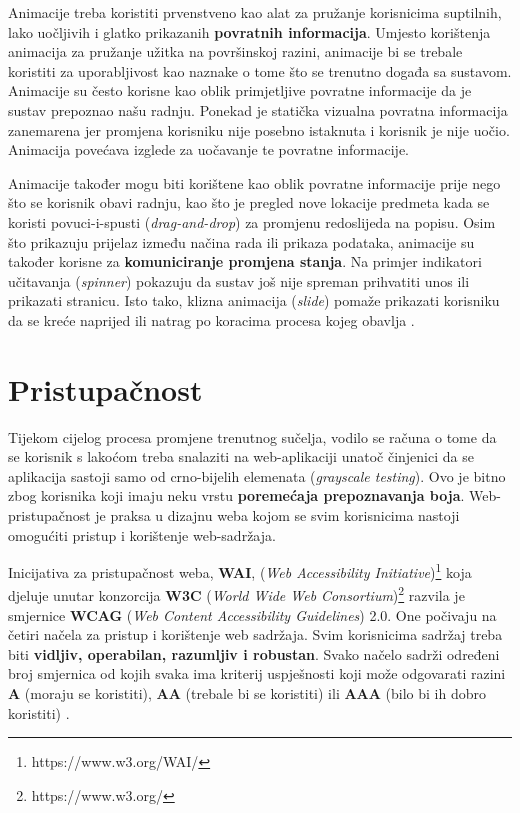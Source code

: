 \documentclass[times, utf8, zavrsni, numeric]{fer}
\begin{document}
    Animacije treba koristiti prvenstveno kao alat za pružanje korisnicima suptilnih, lako uočljivih i glatko prikazanih \textbf{povratnih informacija}. Umjesto korištenja animacija za pružanje užitka na površinskoj razini, animacije bi se trebale koristiti za uporabljivost kao naznake o tome što se trenutno događa sa sustavom. Animacije su često korisne kao oblik primjetljive povratne informacije da je sustav prepoznao našu radnju. Ponekad je statička vizualna povratna informacija zanemarena jer promjena korisniku nije posebno istaknuta i korisnik je nije uočio. Animacija povećava izglede za uočavanje te povratne informacije.
    
    Animacije također mogu biti korištene kao oblik povratne informacije prije nego što se korisnik obavi radnju, kao što je pregled nove lokacije predmeta kada se koristi povuci-i-spusti (\textit{drag-and-drop}) za promjenu redoslijeda na popisu. Osim što prikazuju prijelaz između načina rada ili prikaza podataka, animacije su također korisne za \textbf{komuniciranje promjena stanja}. Na primjer indikatori učitavanja (\textit{spinner}) pokazuju da sustav još nije spreman prihvatiti unos ili prikazati stranicu. Isto tako, klizna animacija (\textit{slide}) pomaže prikazati korisniku da se kreće naprijed ili natrag po koracima procesa kojeg obavlja \cite{anim}.

    \section{Pristupačnost}
    Tijekom cijelog procesa promjene trenutnog sučelja, vodilo se računa o tome da se korisnik s lakoćom treba snalaziti na web-aplikaciji unatoč činjenici da se aplikacija sastoji samo od crno-bijelih elemenata (\textit{grayscale testing}). Ovo je bitno zbog korisnika koji imaju neku vrstu \textbf{poremećaja prepoznavanja boja}. Web-pristupačnost je praksa u dizajnu weba kojom se svim korisnicima nastoji omogućiti pristup i korištenje web-sadržaja.
    
    Inicijativa za pristupačnost weba, \textbf{WAI}, (\textit{Web Accessibility Initiative})\footnote{https://www.w3.org/WAI/} koja djeluje unutar konzorcija \textbf{W3C} (\textit{World Wide Web Consortium})\footnote{https://www.w3.org/} razvila je smjernice \textbf{WCAG} (\textit{Web Content Accessibility Guidelines}) 2.0. One počivaju na četiri načela za pristup i korištenje web sadržaja. Svim korisnicima sadržaj treba biti \textbf{vidljiv, operabilan, razumljiv i robustan}. Svako načelo sadrži određeni broj smjernica od kojih svaka ima kriterij uspješnosti koji može odgovarati razini \textbf{A} (moraju se koristiti), \textbf{AA} (trebale bi se koristiti) ili \textbf{AAA} (bilo bi ih dobro koristiti) \cite{pristup}  .
    
\end{document}
